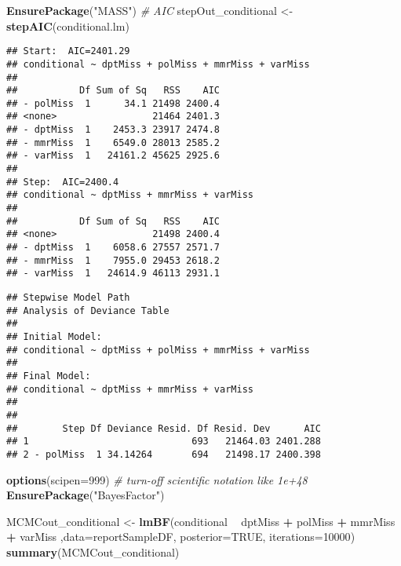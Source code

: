 \documentclass[]{article}
\newenvironment{Shaded}{\begin{snugshade}}{\end{snugshade}}
\newcommand{\CommentTok}[1]{\textcolor[rgb]{0.56,0.35,0.01}{\textit{#1}}}
\newcommand{\DataTypeTok}[1]{\textcolor[rgb]{0.13,0.29,0.53}{#1}}
\newcommand{\DecValTok}[1]{\textcolor[rgb]{0.00,0.00,0.81}{#1}}
\newcommand{\KeywordTok}[1]{\textcolor[rgb]{0.13,0.29,0.53}{\textbf{#1}}}
\newcommand{\NormalTok}[1]{#1}
\newcommand{\OperatorTok}[1]{\textcolor[rgb]{0.81,0.36,0.00}{\textbf{#1}}}
\newcommand{\OtherTok}[1]{\textcolor[rgb]{0.56,0.35,0.01}{#1}}
\newcommand{\StringTok}[1]{\textcolor[rgb]{0.31,0.60,0.02}{#1}}
\begin{document}
\begin{Shaded}
\begin{Highlighting}[]
\KeywordTok{EnsurePackage}\NormalTok{(}\StringTok{"MASS"}\NormalTok{) }\CommentTok{# AIC}
\NormalTok{stepOut_conditional <-}\StringTok{ }\KeywordTok{stepAIC}\NormalTok{(conditional.lm)}
\end{Highlighting}
\end{Shaded}

\begin{verbatim}
## Start:  AIC=2401.29
## conditional ~ dptMiss + polMiss + mmrMiss + varMiss
## 
##           Df Sum of Sq   RSS    AIC
## - polMiss  1      34.1 21498 2400.4
## <none>                 21464 2401.3
## - dptMiss  1    2453.3 23917 2474.8
## - mmrMiss  1    6549.0 28013 2585.2
## - varMiss  1   24161.2 45625 2925.6
## 
## Step:  AIC=2400.4
## conditional ~ dptMiss + mmrMiss + varMiss
## 
##           Df Sum of Sq   RSS    AIC
## <none>                 21498 2400.4
## - dptMiss  1    6058.6 27557 2571.7
## - mmrMiss  1    7955.0 29453 2618.2
## - varMiss  1   24614.9 46113 2931.1
\end{verbatim}

\begin{Shaded}
\end{Shaded}

\begin{verbatim}
## Stepwise Model Path 
## Analysis of Deviance Table
## 
## Initial Model:
## conditional ~ dptMiss + polMiss + mmrMiss + varMiss
## 
## Final Model:
## conditional ~ dptMiss + mmrMiss + varMiss
## 
## 
##        Step Df Deviance Resid. Df Resid. Dev      AIC
## 1                             693   21464.03 2401.288
## 2 - polMiss  1 34.14264       694   21498.17 2400.398
\end{verbatim}

\begin{Shaded}
\begin{Highlighting}[]
\KeywordTok{options}\NormalTok{(}\DataTypeTok{scipen=}\DecValTok{999}\NormalTok{)  }\CommentTok{# turn-off scientific notation like 1e+48}
\KeywordTok{EnsurePackage}\NormalTok{(}\StringTok{"BayesFactor"}\NormalTok{)}

\NormalTok{MCMCout_conditional <-}\StringTok{ }\KeywordTok{lmBF}\NormalTok{(conditional }\OperatorTok{~}\StringTok{ }\NormalTok{dptMiss }\OperatorTok{+}\StringTok{ }\NormalTok{polMiss }\OperatorTok{+}\StringTok{ }\NormalTok{mmrMiss }\OperatorTok{+}\StringTok{ }\NormalTok{varMiss ,}\DataTypeTok{data=}\NormalTok{reportSampleDF, }\DataTypeTok{posterior=}\OtherTok{TRUE}\NormalTok{, }\DataTypeTok{iterations=}\DecValTok{10000}\NormalTok{)}
\KeywordTok{summary}\NormalTok{(MCMCout_conditional)}
\end{Highlighting}
\end{Shaded}
\end{document}

